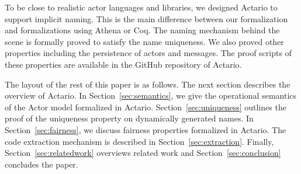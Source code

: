 To be close to realistic actor languages and libraries, we designed
Actario to support implicit naming. This is the main difference between
our formalization and formalizations using Athena\cite{Musser:2013aa}
or Coq\cite{Garnock-Jones:2014aa}. The naming mechanism behind the scene
is formally proved to satisfy the name uniqueness.  We also proved other
properties including the persistence of actors and messages.  The proof
scripts of these properties are available in the GitHub repository of
Actario\cite{Actario}.






The layout of the rest of this paper is as follows.
The next section describes the overview of Actario.
In Section~\ref{sec:semantics}, we give the operational semantics of the Actor model formalized in Actario.
Section~\ref{sec:uniqueness} outlines the proof of the uniqueness property on dynamically generated names.
In Section~\ref{sec:fairness}, we discuss fairness properties formalized in Actario.
The code extraction mechanism is described in Section~\ref{sec:extraction}.
Finally, Section~\ref{sec:relatedwork} overviews related work and Section~\ref{sec:conclusion} concludes the paper.

